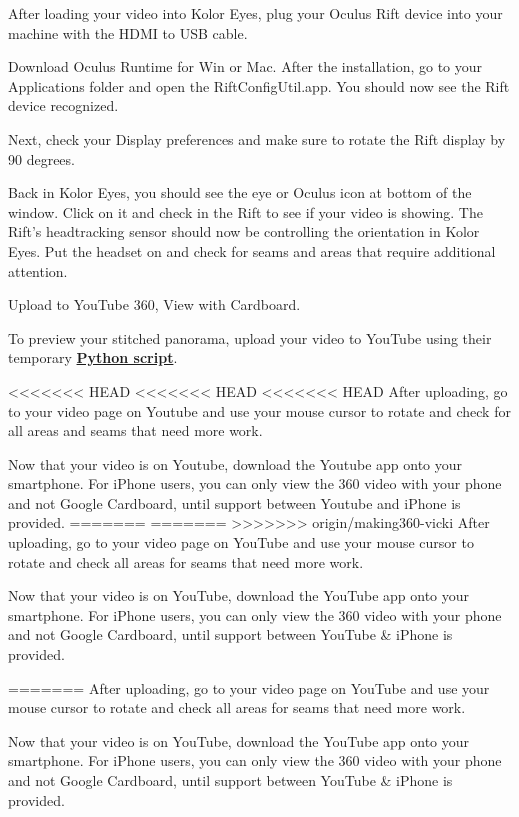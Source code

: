 \begin{fullwidth}
After loading your video into Kolor Eyes, plug your Oculus Rift device into your machine with the HDMI to USB cable.

Download Oculus Runtime for Win or Mac. After the installation, go to your Applications folder and open the RiftConfigUtil.app. You should now see the Rift device recognized.


Next, check your Display preferences and make sure to rotate the Rift display by 90 degrees.


Back in Kolor Eyes, you should see the eye or Oculus icon at bottom of the window. Click on it and check in the Rift to see if your video is showing. The Rift’s headtracking sensor should now be controlling the orientation in Kolor Eyes. Put the headset on and check for seams and areas that require additional attention.

\clearpage
{\large Upload to YouTube 360, View with Cardboard. \par}

To preview your stitched panorama, upload your video to YouTube using their temporary \textbf{\href{https://www.youtube.com/watch?v=Z8VlD2rtACA}{Python script}}.

<<<<<<< HEAD
<<<<<<< HEAD
<<<<<<< HEAD
After uploading, go to your video page on Youtube and use your mouse cursor to rotate and check for all areas and seams that need more work.

Now that your video is on Youtube, download the Youtube app onto your smartphone. For iPhone users, you can only view the 360 video with your phone and not Google Cardboard, until support between Youtube and iPhone is provided.
=======
=======
>>>>>>> origin/making360-vicki
After uploading, go to your video page on YouTube and use your mouse cursor to rotate and check all areas for seams that need more work.

Now that your video is on YouTube, download the YouTube app onto your smartphone. For iPhone users, you can only view the 360 video with your phone and not Google Cardboard, until support between YouTube & iPhone is provided.

=======
After uploading, go to your video page on YouTube and use your mouse cursor to rotate and check all areas for seams that need more work.

Now that your video is on YouTube, download the YouTube app onto your smartphone. For iPhone users, you can only view the 360 video with your phone and not Google Cardboard, until support between YouTube & iPhone is provided.


\end{fullwidth}
